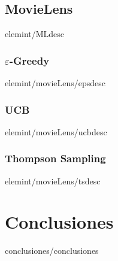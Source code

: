 \documentclass[epsbased,loall,copyright,final,printable,covers,extendedindex,firstnumbered,tfg,overleaf]{tfgtfmthesisuam}
\begin{document}
  \section{MovieLens\label{SEC:ML}}{elemint/MLdesc}
    \subsection{$\varepsilon$-Greedy\label{SS:EPSML}}{elemint/movieLens/epsdesc}
    \subsection{UCB\label{SS:UCBML}}{elemint/movieLens/ucbdesc}
    \subsection{Thompson Sampling\label{SS:TSML}}{elemint/movieLens/tsdesc}
\chapter{Conclusiones\label{CAP:COMPILACION}}{conclusiones/conclusiones}


\appendix

\end{document}
